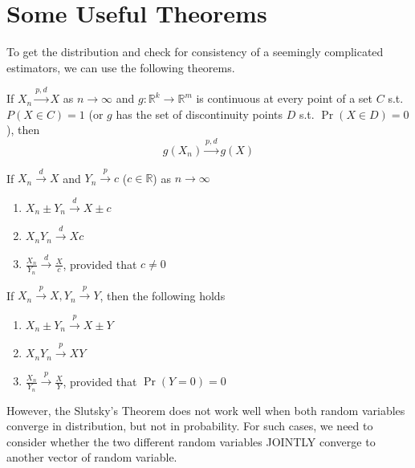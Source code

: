 \section{Some Useful Theorems}
To get the distribution and check for consistency of a seemingly complicated estimators, we can use the following theorems. 
\begin{mdframed}[backgroundcolor=green!5] 

\begin{theorem}
If $X_n\xrightarrow{p,d}X$ as $n\to\infty$ and $g:\mathbb{R}^k\to\mathbb{R}^m$ is continuous at every point of a set $C$ s.t. $P(X\in C)=1$ (or $g$  has the set of discontinuity points $D$ s.t. $\Pr(X\in D)=0$), then
\[
g(X_n)\xrightarrow{p,d}g(X)
\]
\end{theorem}

\begin{theorem}
If $X_n\xrightarrow{d}X$ and $Y_n\xrightarrow{p}c$ ($c\in\mathbb{R}$) as $n\to\infty$
\begin{enumerate}
\item $X_n \pm Y_n \xrightarrow{d} X\pm c$
\item $X_nY_n \xrightarrow{d}Xc$
\item $\frac{X_n}{Y_n}\xrightarrow{d} \frac{X}{c}$, provided that $c\neq0$
\end{enumerate}
If $X_n\xrightarrow{p}X, Y_n\xrightarrow{p}Y$, then the following holds
\begin{enumerate}
\item $X_n \pm Y_n \xrightarrow{p} X\pm Y$
\item $X_nY_n \xrightarrow{p}XY$
\item $\frac{X_n}{Y_n}\xrightarrow{p} \frac{X}{Y}$, provided that $\Pr(Y=0)=0$
\end{enumerate}
\end{theorem}
\end{mdframed}\par
However, the Slutsky's Theorem does not work well when both random variables converge in distribution, but not in probability. For such cases, we need to consider whether the two different random variables JOINTLY converge to another vector of random variable. \par
